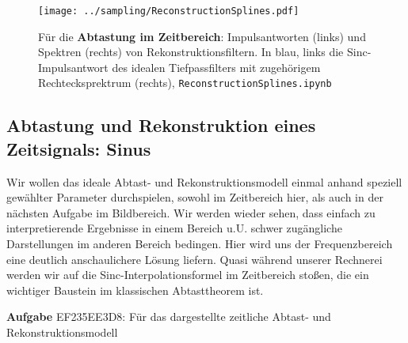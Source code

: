 \begin{figure}
\texttt{[image: ../sampling/ReconstructionSplines.pdf]}
  \caption{Für die \textbf{Abtastung im Zeitbereich}: Impulsantworten (links) und
  Spektren (rechts) von
  Rekonstruktionsfiltern. In blau, links die Sinc-Impulsantwort des idealen
  Tiefpassfilters mit zugehörigem Rechtecksprektrum (rechts),
  \texttt{ReconstructionSplines.ipynb}}
  \label{fig:ReconstructionSplines}
\end{figure}



\clearpage
\subsection{Abtastung und Rekonstruktion eines Zeitsignals: Sinus}
\label{sec:EF235EE3D8}
\begin{Ziel}
Wir wollen das ideale Abtast- und Rekonstruktionsmodell einmal
anhand speziell gewählter Parameter durchspielen, sowohl im Zeitbereich hier, als
auch in der nächsten Aufgabe im Bildbereich. Wir werden wieder sehen,
dass einfach zu interpretierende
Ergebnisse in einem Bereich u.U. schwer zugängliche Darstellungen im anderen Bereich
bedingen. Hier wird uns der Frequenzbereich eine deutlich anschaulichere Lösung
liefern. Quasi während unserer Rechnerei werden wir auf die
Sinc-Interpolationsformel im Zeitbereich stoßen,
die ein wichtiger Baustein im klassischen Abtasttheorem ist.
\end{Ziel}
\textbf{Aufgabe} {\tiny EF235EE3D8}:
Für das dargestellte zeitliche Abtast- und Rekonstruktionsmodell
